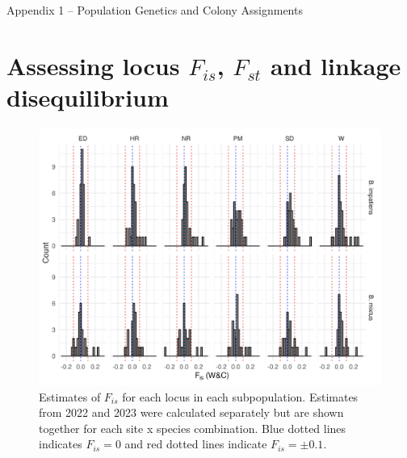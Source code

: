 \documentclass[12pt]{article}
\def\title{Appendix 1 -- Population Genetics and Colony Assignments}
\begin{document}
\begin{center}
  {\large \title \par}
\end{center}\par

\section{Assessing locus $F_{is}$, $F_{st}$ and linkage disequilibrium}

\begin{figure}[H]
    \centering
    \includegraphics[width=\linewidth]{appendix_figures/Fis.jpg}
    \caption{Estimates of $F_{is}$ for each locus in each subpopulation. Estimates from 2022 and 2023 were calculated separately but are shown together for each site x species combination. Blue dotted lines indicates $F_{is} = 0$ and red dotted lines indicate $F_{is} = \pm 0.1$.}
    \label{fig:Fis}
\end{figure}
\end{document}
